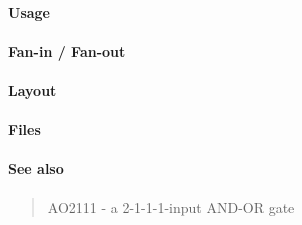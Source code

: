 \paragraph{Usage}

\paragraph{Fan-in / Fan-out}

\paragraph{Layout}

\paragraph{Files}

\paragraph{See also}
\begin{quote}
    AO2111 - a 2-1-1-1-input AND-OR gate
\end{quote}
